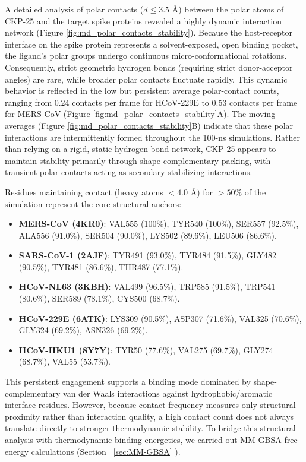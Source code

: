 \documentclass[pharmaceuticals,article,submit,pdftex,moreauthors]{Definitions/mdpi}
\begin{document}
A detailed analysis of polar contacts ($d \leq 3.5$ \AA) between the polar atoms of CKP-25 and the target spike proteins revealed a highly dynamic interaction network (Figure \ref{fig:md_polar_contacts_stability}). Because the host-receptor interface on the spike protein represents a solvent-exposed, open binding pocket, the ligand's polar groups undergo continuous micro-conformational rotations. Consequently, strict geometric hydrogen bonds (requiring strict donor-acceptor angles) are rare, while broader polar contacts fluctuate rapidly. This dynamic behavior is reflected in the low but persistent average polar-contact counts, ranging from 0.24 contacts per frame for HCoV-229E to 0.53 contacts per frame for MERS-CoV (Figure \ref{fig:md_polar_contacts_stability}A). The moving averages (Figure \ref{fig:md_polar_contacts_stability}B) indicate that these polar interactions are intermittently formed throughout the 100-ns simulations. Rather than relying on a rigid, static hydrogen-bond network, CKP-25 appears to maintain stability primarily through shape-complementary packing, with transient polar contacts acting as secondary stabilizing interactions.

Residues maintaining contact (heavy atoms $< 4.0$ \AA) for $>50\%$ of the simulation represent the core structural anchors:
\begin{itemize}
    \item \textbf{MERS-CoV (4KR0)}: VAL555 (100\%), TYR540 (100\%), SER557 (92.5\%), ALA556 (91.0\%), SER504 (90.0\%), LYS502 (89.6\%), LEU506 (86.6\%).
    \item \textbf{SARS-CoV-1 (2AJF)}: TYR491 (93.0\%), TYR484 (91.5\%), GLY482 (90.5\%), TYR481 (86.6\%), THR487 (77.1\%).
    \item \textbf{HCoV-NL63 (3KBH)}: VAL499 (96.5\%), TRP585 (91.5\%), TRP541 (80.6\%), SER589 (78.1\%), CYS500 (68.7\%).
    \item \textbf{HCoV-229E (6ATK)}: LYS309 (90.5\%), ASP307 (71.6\%), VAL325 (70.6\%), GLY324 (69.2\%), ASN326 (69.2\%).
    \item \textbf{HCoV-HKU1 (8Y7Y)}: TYR50 (77.6\%), VAL275 (69.7\%), GLY274 (68.7\%), VAL55 (53.7\%).
\end{itemize}
This persistent engagement supports a binding mode dominated by shape-complementary van der Waals interactions against hydrophobic/aromatic interface residues. However, because contact frequency measures only structural proximity rather than interaction quality, a high contact count does not always translate directly to stronger thermodynamic stability. To bridge this structural analysis with thermodynamic binding energetics, we carried out MM-GBSA free energy calculations (Section ~\ref{sec:MM-GBSA} ).
\end{document}
